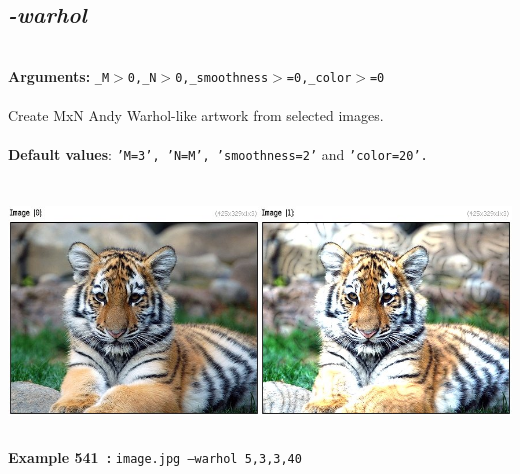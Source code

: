 \documentclass[a4paper,11pt,twoside]{book}
\begin{document}
\subsection{\emph{-warhol} }\vspace*{-0.5em}
~\\\textbf{Arguments: } 
{\small \texttt{\_M$>$0,\_N$>$0,\_smoothness$>$=0,\_color$>$=0}}\\~\\
Create MxN Andy Warhol-like artwork from selected images.
~\\~\\\textbf{Default values}: {\small \texttt{'M=3', 'N=M', 'smoothness=2'} and \texttt{'color=20'.}}
\begin{center}\includegraphics[keepaspectratio=true,height=7cm,width=\textwidth]{img/gmic_def541.jpg}\\
{\footnotesize \textbf{Example 541~:} \texttt{image.jpg --warhol 5,3,3,40}}
\end{center}
\end{document}
